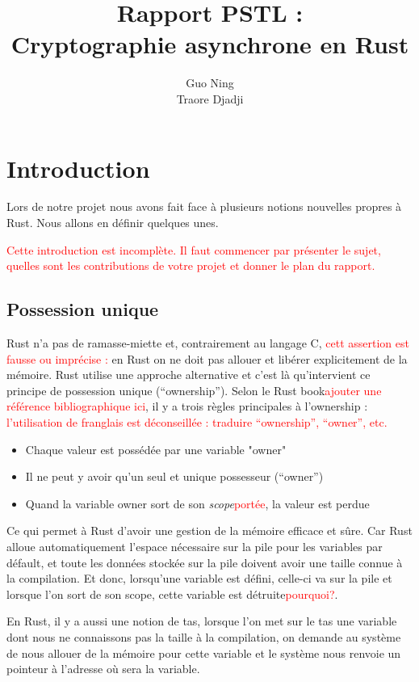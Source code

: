 \documentclass{article}
\title{Rapport PSTL : \\ Cryptographie asynchrone en Rust}
\author{Guo Ning \\ Traore Djadji }
\newcommand{\TODO}[1]{\textcolor{red}{#1}}
\begin{document}
\maketitle
\newpage


\section{Introduction}
Lors de notre projet nous avons fait face à plusieurs notions nouvelles propres à Rust. Nous allons en définir quelques unes.

\TODO{Cette introduction est incomplète. Il faut commencer par présenter le sujet, quelles sont les contributions de votre projet et donner le plan du rapport.}

\subsection{Possession unique} 

Rust n'a pas de ramasse-miette et, contrairement au langage C, \TODO{cett assertion est fausse ou imprécise :} en Rust on ne doit pas allouer et libérer explicitement de la mémoire. Rust utilise une approche alternative et c'est là qu'intervient ce principe de possession unique (``ownership''). Selon le Rust book\TODO{ajouter une référence bibliographique ici}, il y a trois règles principales à l'ownership : \TODO{l'utilisation de franglais est déconseillée : traduire ``ownership'', ``owner'', etc.}

\begin{itemize}  
\item Chaque valeur est possédée par une variable "owner"
\item Il ne peut y avoir qu'un seul et unique possesseur (``owner'')
\item Quand la variable owner sort de son \textit{scope}\TODO{portée}, la valeur est perdue
\end{itemize}

Ce qui permet à Rust d'avoir une gestion de la mémoire efficace et sûre. Car Rust alloue automatiquement l'espace nécessaire sur la pile pour les variables par défault, et toute les données stockée sur la pile doivent avoir une taille connue à la compilation. Et donc, lorsqu'une variable est défini, celle-ci va sur la pile et lorsque l'on sort de son scope, cette variable est détruite\TODO{pourquoi?}. 

En Rust, il y a aussi une notion de tas, lorsque l'on met sur le tas une variable dont nous ne connaissons pas la taille à la compilation, on demande au système de nous allouer de la mémoire pour cette variable et le système nous renvoie un pointeur à l'adresse où sera la variable.
\end{document}
